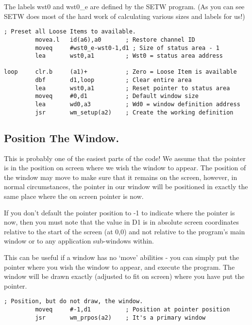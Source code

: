 The labels wst0 and wst0\_e are defined by the SETW program. (As
      you can see SETW does most of the hard work of calculating various sizes
      and labels for us!)

\begin{lstlisting}[firstnumber=last,caption={EasyPEasy Standard Code - Loose Item Initialisation},label={lst:EasyPEasy-4}]
; Preset all Loose Items to available.
         movea.l   id(a6),a0       ; Restore channel ID
         moveq     #wst0_e-wst0-1,d1 ; Size of status area - 1
         lea       wst0,a1         ; Wst0 = status area address

loop     clr.b     (a1)+           ; Zero = Loose Item is available
         dbf       d1,loop         ; Clear entire area
         lea       wst0,a1         ; Reset pointer to status area
         moveq     #0,d1           ; Default window size
         lea       wd0,a3          ; Wd0 = window definition address
         jsr       wm_setup(a2)    ; Create the working definition
\end{lstlisting}

\subsection{Position The Window.}

This is probably one of the easiest parts of the code! We assume
      that the pointer is in the position on screen where we wish the window
      to appear. The position of the window may move to make sure that it
      remains on the screen, however, in normal circumstances, the pointer in
      our window will be positioned in exactly the same place where the on
      screen pointer is now.

\begin{note}
If you don't default the pointer position to -{}1 to indicate
        where the pointer is now, then you must note that the value in D1 is
        in absolute screen coordinates relative to the start of the screen (at
        0,0) and not relative to the program's main window or to any
        application sub-{}windows within.
\end{note}

This can be useful if a window has no `move' abilities -{} you can
      simply put the pointer where you wish the window to appear, and execute
      the program. The window will be drawn exactly (adjusted to fit on
      screen) where you have put the pointer.

\begin{lstlisting}[firstnumber=last,caption={EasyPEasy Standard Code - Position the Window},label={lst:EasyPEasy-5}]
; Position, but do not draw, the window.
         moveq     #-1,d1          ; Position at pointer position
         jsr       wm_prpos(a2)    ; It's a primary window
\end{lstlisting}

